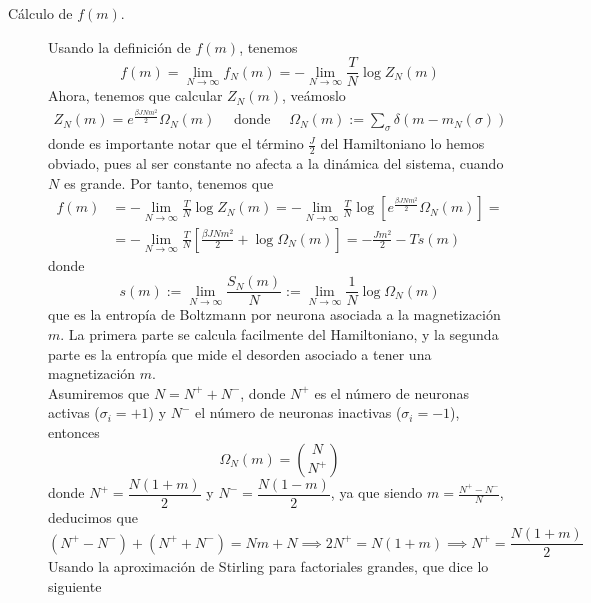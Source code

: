 \begin{description}
    \item[Cálculo de $f(m)$.] Usando la definición de $f(m)$, tenemos
    \begin{equation*}
        f(m) = \lim_{N\to \infty}f_N(m) =-\lim_{N\to \infty} \frac{T}{ N} \log Z_N(m)
    \end{equation*}
    Ahora, tenemos que calcular $Z_N(m)$, veámoslo
    \begin{align*}
        Z_N(m) =e^{\frac{\beta J Nm^2}{2}} \Omega_N(m) \quad \text{ donde } \quad \Omega_N(m) :=\sum_{\sigma} \delta(m - m_N(\sigma))
    \end{align*}
    donde es importante notar que el término $\frac{J}{2}$ del Hamiltoniano lo hemos obviado, pues al ser constante no afecta a la dinámica del sistema, cuando $N$ es grande. Por tanto, tenemos que
    \begin{align*}
        f(m) &= -\lim_{N\to \infty} \frac{T}{ N} \log Z_N(m)= -\lim_{N\to \infty} \frac{T}{ N} \log \left[ e^{\frac{\beta J Nm^2}{2}} \Omega_N(m) \right] = \\
        &= -\lim_{N\to \infty} \frac{T}{ N} \left[ \frac{\beta J Nm^2}{2} + \log \Omega_N(m) \right] = -\frac{Jm^2}{2} - T s(m)
    \end{align*}
    donde 
    \begin{equation*}
        s(m) := \lim_{N\to \infty} \dfrac{S_N(m)}{N} := \lim_{N\to \infty} \frac{1}{N} \log \Omega_N(m)
    \end{equation*}
    que es la entropía de Boltzmann por neurona asociada a la magnetización $m$. La primera parte se calcula facilmente del Hamiltoniano, y la segunda parte es la entropía que mide el desorden asociado a tener una magnetización $m$. \\
    \noindent
    Asumiremos que $N=N^++N^-$, donde $N^+$ es el número de neuronas activas ($\sigma_i = +1$) y $N^-$ el número de neuronas inactivas ($\sigma_i = -1$), entonces
    \begin{equation*}
        \Omega_N(m) = \binom{N}{N^+}
    \end{equation*}
    donde $N^+ = \dfrac{N(1+m)}{2}$ y $N^- = \dfrac{N(1-m)}{2}$, ya que siendo $m=\frac{N^+ - N^-}{N}$, deducimos que
    \begin{equation*}
        (N^+ - N^-) + (N^+ + N^-) = Nm + N \implies 2N^+ = N(1+m) \implies N^+ = \frac{N(1+m)}{2}
    \end{equation*}
    Usando la aproximación de Stirling para factoriales grandes, que dice lo siguiente
    \begin{equation*}

\end{equation*}
\end{description}
